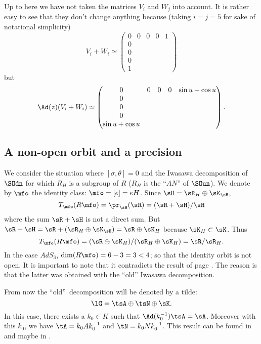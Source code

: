 Up to here we have not taken the matrices $V_i$ and $W_j$ into account. It is rather easy to see that they don't change anything because (taking $i=j=5$ for sake of notational simplicity)
\[
	V_i+W_i\simeq
	\begin{pmatrix}
		0 & 0 & 0 & 0 & 1 \\
		0                 \\
		0                 \\
		0                 \\
		1
	\end{pmatrix}
\]
but
\[
	\Ad(z)(V_i+W_i)\simeq
	\begin{pmatrix}
		0 & 0 & 0 & 0 & \sin u+\cos u \\
		0                             \\
		0                             \\
		0                             \\
		\sin u+\cos u
	\end{pmatrix}.
\]

\subsection{A non-open orbit and a precision}\label{subsec:precision}

We consider the situation where $[\sigma,\theta]=0$ and the Iwasawa decomposition of $\SOdn$ for which $R_H$ is a subgroup of $R$ ($R_H$ is the ``$AN$''{} of $\SOun$). We denote by $\mfo$ the identity class: $\mfo=[e]=eH$. Since $\sH=\sR_H\oplus\sK_{\sH}$,
\[
	T_{\mfo}(R\mfo)=\pr_{\sH}(\sR)=(\sR+\sH)/\sH
\]
where the sum $\sR+\sH$ is not a direct sum. But $\sR+\sH=\sR+(\sR_H\oplus\sK_{\sH})=\sR\oplus\sK_H$ because $\sK_H\subset\sK$. Thus
\[
	T_{\mfo}(R\mfo)=(\sR\oplus\sK_H)/(\sR_H\oplus\sK_H)=\sR/\sR_H.
\]
\label{pg:subt_tilde}In the case $AdS_3$, $\dim(R\mfo)=6-3=3<4$; so that the identity orbit is not open. It is important to note that it contradicts the result of page \pageref{pg:mfo_ouvert}. The reason is that the latter was obtained with the ``old''{} Iwasawa decomposition.

From now the ``old''\ decomposition will be denoted by a tilde:
\[
	\lG=\tsA\oplus\tsN\oplus\sK.
\]
In this case, there exists a $k_0\in K$ such that $\Ad(k_0^{-1})\tsA=\sA$.  Moreover with this $k_0$, we have $\tA=k_0Ak_0^{-1}$ and $\tN=k_0Nk_0^{-1}$. This result can be found in \cite{Helgason} and maybe in \cite{Wisser}.

